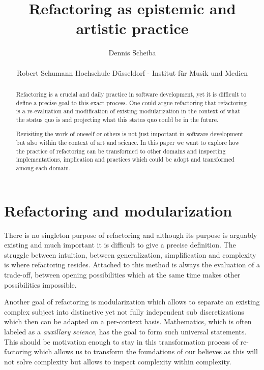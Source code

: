 \documentclass[10pt,twocolumn,letterpaper]{article}
\newcommand\email[1]{\small{\href{mailto:#1}{\color{black}{\nolinkurl{#1}}}}}
\begin{document}
\title{Refactoring as epistemic and artistic practice}

\author{Dennis Scheiba\\
\email{dennis.scheiba@rsh-duesseldorf.de}\\
Robert Schumann Hochschule Düsseldorf - Institut für Musik und Medien\\
}
\maketitle

\begin{abstract}
\vspace{-1em}
Refactoring is a crucial and daily practice in software development, yet it is difficult to define a precise goal to this exact process.
One could argue refactoring that refactoring is a re-evaluation and modification of existing modularization in the context of what the status quo is and projecting what this status quo could be in the future.

Revisiting the work of oneself or others is not just important in software development but also within the context of art and science.
In this paper we want to explore how the practice of refactoring can be transformed to other domains and inspecting implementations, implication and practices which could be adopt and transformed among each domain.
\end{abstract}

\vspace{-1em}

\section{Refactoring and modularization} \label{what}

There is no singleton purpose of refactoring and although its purpose is arguably existing and much important
it is difficult to give a precise definition.
The struggle between intuition, between generalization, simplification and complexity is where refactoring resides.
Attached to this method is always the evaluation of a trade-off, between opening possibilities which at the same time makes other possibilities impossible.

Another goal of refactoring is modularization which allows to separate an existing complex subject into distinctive yet not fully independent sub discretizations which then can be adapted on a per-context basis.
Mathematics, which is often labeled as a \textit{auxillary science}, has the goal to form such universal statements.
This should be motivation enough to stay in this transformation process of re-factoring which allows us to transform the foundations of our believes as this will not solve complexity but allows to inspect complexity within complexity.
\end{document}
